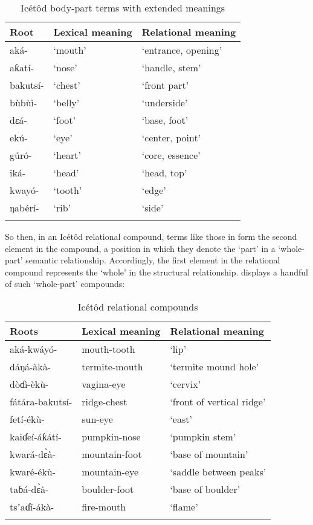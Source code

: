 \begin{table}
\caption{Icétôd body-part terms with extended meanings}
\label{tab:nouns:rel1}


\begin{tabularx}{\textwidth}{XXX}
\lsptoprule

Root & Lexical meaning & Relational meaning\\
\midrule
aká- & ‘mouth’ & ‘entrance, opening’\\
aƙatí- & ‘nose’ & ‘handle, stem’\\
bakutsí- & ‘chest’ & ‘front part’\\
bùbùì- & ‘belly’ & ‘underside’\\
dɛá- & ‘foot’ & ‘base, foot’\\
ekú- & ‘eye’ & ‘center, point’\\
gúró- & ‘heart’ & ‘core, essence’\\
iká- & ‘head’ & ‘head, top’\\
kwayó- & ‘tooth’ & ‘edge’\\
ŋabérí- & ‘rib’ & ‘side’\\
\lspbottomrule
\end{tabularx}
\end{table}
So then, in an Icétôd relational compound, terms like those in  form the second element in the compound, a position in which they denote the ‘part’ in a ‘whole-part’ semantic relationship. Accordingly, the first element in the relational compound represents the ‘whole’ in the structural relationship.  displays a handful of such ‘whole-part’ compounds:


\begin{table}
\caption{Icétôd relational compounds}
\label{tab:nouns:rel2}


\begin{tabularx}{\textwidth}{XXX}
\lsptoprule

Roots & Lexical meaning & Relational meaning\\
\midrule
aká-kwáyó- & mouth-tooth & ‘lip’\\
dáŋá-àkà- & termite-mouth & ‘termite mound hole’\\
dòɗì-èkù- & vagina-eye & ‘cervix’\\
fátára-bakutsí- & ridge-chest & ‘front of vertical ridge’\\
fetí-ékù- & sun-eye & ‘east’\\
kaiɗeí-áƙátí- & pumpkin-nose & ‘pumpkin stem’\\
kwará-d\`{ɛ}à- & mountain-foot & ‘base of mountain’\\
kwaré-ékù- & mountain-eye & ‘saddle between peaks’\\
taɓá-d\`{ɛ}à- & boulder-foot & ‘base of boulder’\\
tsʼaɗí-ákà- & fire-mouth & ‘flame’\\
\lspbottomrule
\end{tabularx}
\end{table}


